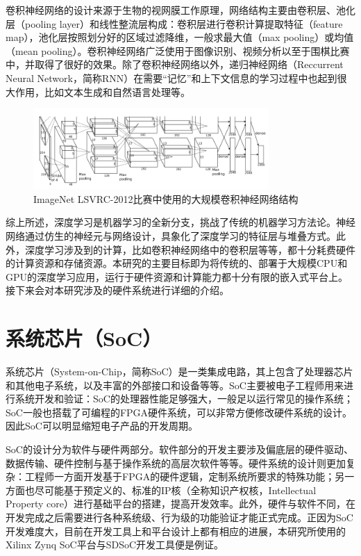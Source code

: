 卷积神经网络的设计来源于生物的视网膜工作原理，网络结构主要由卷积层、池化层（pooling layer）和线性整流层构成：卷积层进行卷积计算提取特征（feature map），池化层按照划分好的区域过滤降维，一般求最大值（max pooling）或均值（mean pooling）。卷积神经网络广泛使用于图像识别、视频分析以至于围棋比赛中，并取得了很好的效果。除了卷积神经网络以外，递归神经网络（Reccurrent Neural Network，简称RNN）在需要“记忆”和上下文信息的学习过程中也起到很大作用，比如文本生成和自然语言处理等。
\begin{figure}[!ht]
\centering
	\includegraphics[width=0.8\textwidth]{assets/imgs/imagenet-cnn}
\caption{ImageNet LSVRC-2012比赛中使用的大规模卷积神经网络结构\supercite{krizhevsky2012imagenet}}
\end{figure}

综上所述，深度学习是机器学习的全新分支，挑战了传统的机器学习方法论。神经网络通过仿生的神经元与网络设计，具象化了深度学习的特征层与堆叠方式。此外，深度学习涉及到的计算，比如卷积神经网络中的卷积层等等，都十分耗费硬件的计算资源和存储资源。本研究的主要目标即为将传统的、部署于大规模CPU和GPU的深度学习应用，运行于硬件资源和计算能力都十分有限的嵌入式平台上。接下来会对本研究涉及的硬件系统进行详细的介绍。

\section{系统芯片（SoC）}

系统芯片（System-on-Chip，简称SoC）是一类集成电路，其上包含了处理器芯片和其他电子系统，以及丰富的外部接口和设备等等。SoC主要被电子工程师用来进行系统开发和验证：SoC的处理器性能足够强大，一般足以运行常见的操作系统；SoC一般也搭载了可编程的FPGA硬件系统，可以非常方便修改硬件系统的设计。因此SoC可以明显缩短电子产品的开发周期。

SoC的设计分为软件与硬件两部分。软件部分的开发主要涉及偏底层的硬件驱动、数据传输、硬件控制与基于操作系统的高层次软件等等。硬件系统的设计则更加复杂：工程师一方面开发基于FPGA的硬件逻辑，定制系统所要求的特殊功能；另一方面也尽可能基于预定义的、标准的IP核（全称知识产权核，Intellectual Property core）进行基础平台的搭建，提高开发效率。此外，硬件与软件不同，在开发完成之后需要进行各种系统级、行为级的功能验证才能正式完成。正因为SoC开发难度大，目前在开发工具上和平台设计上都有相应的进展，本研究所使用的Xilinx Zynq SoC平台与SDSoC开发工具便是例证。

